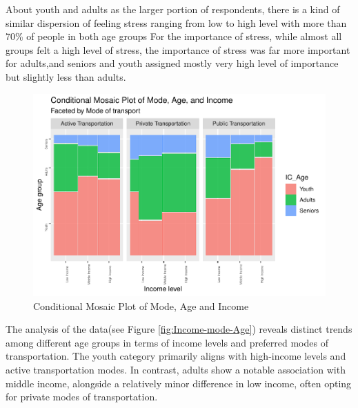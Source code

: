 \documentclass[
11pt, %
oneside, %
english, %
singlespacing, %
]{macthesis} %
\begin{document}
About youth and adults as the larger portion of respondents, there is a kind of similar dispersion of feeling stress ranging from low to high level with more than 70\% of people in both age groups For the importance of stress, while almost all groups felt a high level of stress, the importance of stress was far more important for adults,and seniors and youth assigned mostly very high level of importance but slightly less than adults.
\begin{figure}
\includegraphics[width=0.85\linewidth]{thesis_files/figure-latex/unnamed-chunk-31-1} \caption{\label{fig:Income-mode-Age}Conditional Mosaic Plot of Mode,  Age and Income}\label{fig:unnamed-chunk-31}
\end{figure}
The analysis of the data(see Figure \ref{fig:Income-mode-Age}) reveals distinct trends among different age groups in terms of income levels and preferred modes of transportation. The youth category primarily aligns with high-income levels and active transportation modes. In contrast, adults show a notable association with middle income, alongside a relatively minor difference in low income, often opting for private modes of transportation.
\end{document}
